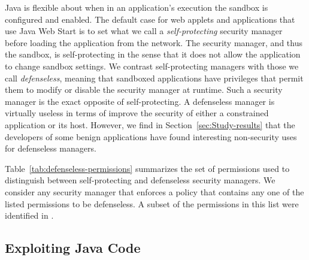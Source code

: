 \documentclass{sig-alternate}
\begin{document}
 Java is flexible about when in an application's execution the sandbox
is configured and enabled. The default case for web applets and applications
that use Java Web Start is to set what we call a \textit{self-protecting} security
manager before loading the application from the network. The security
manager, and thus the sandbox, is self-protecting in the sense that
it does not allow the application to change sandbox settings. We contrast
self-protecting managers with those we call 
\textit{defenseless}, meaning that sandboxed applications have privileges that
permit them to modify or disable the security manager at runtime.  Such a
security manager is the exact opposite
of self-protecting. A defenseless manager is virtually useless in terms of improve the
security of either a constrained application or its host. However, we find
in Section~\ref{sec:Study-results} that the developers of some benign applications
have found interesting non-security uses for defenseless managers. 

Table~\ref{tab:defenseless-permissions} summarizes the set of permissions
used to distinguish between self-protecting and defenseless security
managers. We consider any security manager that enforces a policy
that contains any one of the listed permissions to be defenseless.
A subset of the permissions in this list were identified in \cite{security_explorations_2012}. 


\subsection{Exploiting Java Code}
 \label{sec:Java-Exploits}
\end{document}
